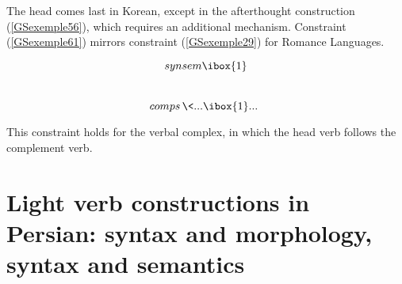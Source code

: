 \documentclass[output=paper
	        ,collection
	        ,collectionchapter
 	        ,biblatex
                ,babelshorthands
                ,newtxmath
                ,draftmode
                ,colorlinks, citecolor=brown
]{langscibook}
\begin{document}
{%
%
%


The head comes last in Korean, except in the afterthought construction (\ref{GSexemple56}), which requires an additional mechanism. Constraint (\ref{GSexemple61}) mirrors constraint (\ref{GSexemple29}) for Romance Languages.

\ea
\label{GSexemple61}
    \begin{avm}
		\[synsem \ibox{1}\] \,\, \,  \[comps\, \<...\ibox{1}...\>\,\]
	\end{avm}
\z

This constraint holds for the verbal complex, in which the head verb follows the complement verb.



\section{Light verb constructions in Persian: syntax and morphology, syntax and semantics}\label{GSsection5}

}
\end{document}
